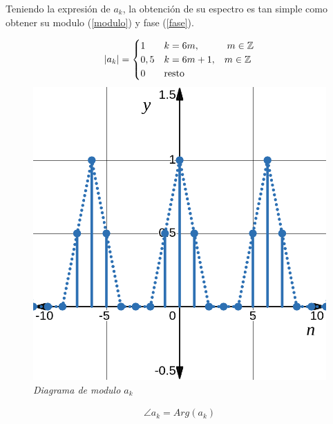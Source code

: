 \documentclass[a4paper,12pt]{report}
\begin{document}
\begin{enumerate}[label=\alph*), left=0pt]
    Teniendo la expresión de $a_k$, la obtención de su espectro es tan simple como obtener su modulo (\ref{modulo}) y
    fase (\ref{fase}).\\

    \begin{figure}[H]
      \centering
      \noindent
      \begin{minipage}{0.4\textwidth}
        \centering
        \begin{align*}
          |a_k| =
          \begin{cases}
            1 &k = 6m, \hspace{1cm} m \in \mathbb{Z}\\
            0,5 &k = 6m+1, \hspace{3mm} m \in \mathbb{Z}\\
            0 &\text{resto}
          \end{cases}
        \end{align*}
        \includegraphics[width=1\textwidth]{./images/ej5.3.png}
        \textit{Diagrama de modulo $a_k$}
      \end{minipage}
      \hspace{1cm}
      \begin{minipage}{0.4\textwidth}
        \centering
        \begin{align*}
          \angle a_k = Arg(a_k)\\[12pt]

\end{align*}
\end{minipage}
\end{figure}
\end{enumerate}
\end{document}

